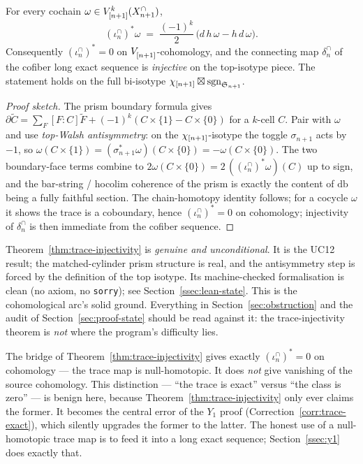 \begin{theorem}
\label{thm:trace-injectivity}
For every cochain $\omega\in V_{[n+1]}^{k}(X^{\cap}_{n+1})$,
\[
  (\iota^{\cap}_n)^{*}\omega\;=\;\frac{(-1)^{k}}{2}\,
  \bigl(d\,h\,\omega-h\,d\,\omega\bigr).
\]
Consequently $(\iota^{\cap}_n)^{*}=0$ on $V_{[n+1]}^{}$-cohomology,
and the connecting map $\delta^{\cap}_n$ of the cofiber long exact
sequence is \emph{injective} on the top-isotype piece. The statement
holds on the full bi-isotype $\chi_{[n+1]}\boxtimes\mathrm{sgn}_{\mathfrak{S}_{n+1}}$.
\end{theorem}

\begin{proof}[Proof sketch]
The prism boundary formula gives $\partial\widetilde C=\sum_F[F:C]
\widetilde F+(-1)^{k}(C\times\{1\}-C\times\{0\})$ for a $k$-cell $C$.
Pair with $\omega$ and use \emph{top-Walsh antisymmetry}: on the
$\chi_{[n+1]}$-isotype the toggle $\sigma_{n+1}$ acts by $-1$, so
$\omega(C\times\{1\})=(\sigma_{n+1}^{*}\omega)(C\times\{0\})=
-\omega(C\times\{0\})$. The two boundary-face terms combine to
$2\omega(C\times\{0\})=2\,((\iota^{\cap}_n)^{*}\omega)(C)$ up to sign,
and the bar-string / hocolim coherence of the prism is exactly the
content of $\mathrm{db}$ being a fully faithful section. The
chain-homotopy identity follows; for a cocycle $\omega$ it shows the
trace is a coboundary, hence $(\iota^{\cap}_n)^{*}=0$ on cohomology;
injectivity of $\delta^{\cap}_n$ is then immediate from the cofiber
sequence.
\end{proof}

\begin{status}
Theorem~\ref{thm:trace-injectivity} is \emph{genuine and
unconditional}. It is the UC12 result; the matched-cylinder prism
structure is real, and the antisymmetry step is forced by the
definition of the top isotype. Its machine-checked formalisation is
clean (no axiom, no \texttt{sorry}); see Section~\ref{ssec:lean-state}.
This is the cohomological arc's solid ground. Everything in
Section~\ref{sec:obstruction} and the audit of
Section~\ref{sec:proof-state} should be read against it: the
trace-injectivity theorem is \emph{not} where the program's difficulty
lies.
\end{status}

\begin{remark}
\label{rem:bridge-vs-y1}
The bridge of Theorem~\ref{thm:trace-injectivity} gives exactly
$(\iota^{\cap}_n)^{*}=0$ on cohomology --- the trace map is
null-homotopic. It does \emph{not} give vanishing of the source
cohomology. This distinction --- ``the trace is exact'' versus ``the
class is zero'' --- is benign here, because
Theorem~\ref{thm:trace-injectivity} only ever claims the former. It
becomes the central error of the $Y_1$ proof
(Correction~\ref{corr:trace-exact}), which silently upgrades the former
to the latter. The honest use of a null-homotopic trace map is to feed
it into a long exact sequence; Section~\ref{ssec:y1} does exactly that.
\end{remark}
